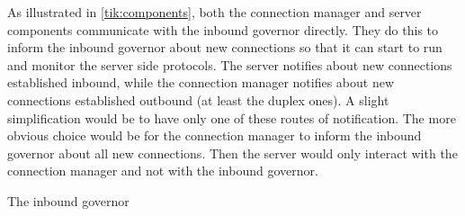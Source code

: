 \begin{designalternative}
As illustrated in \cref{tik:components}, both the connection manager and server
components communicate with the inbound governor directly. They do this to
inform the inbound governor about new connections so that it can start to run
and monitor the server side protocols. The server notifies about new connections
established inbound, while the connection manager notifies about new connections
established outbound (at least the duplex ones).
A slight simplification would be to have only one of these routes of
notification. The more obvious choice would be for the connection manager to
inform the inbound governor about all new connections. Then the server would
only interact with the connection manager and not with the inbound governor.

\begin{center}
\end{center}
\end{designalternative}

The inbound governor 

